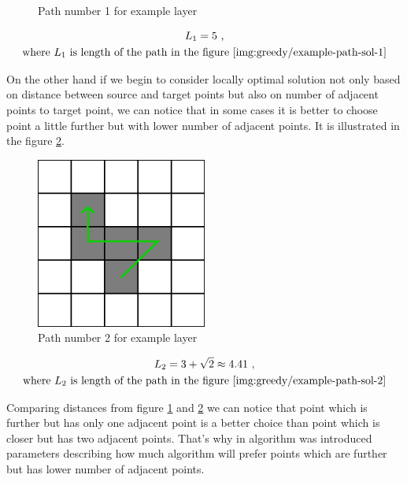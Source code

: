 \documentclass[titlepage]{article}
\newcommand{\multifigcaption}{\captionsetup{justification=justified}}
\begin{document}
\begin{figure}[H]
\begin{center}
\begin{minipage}{.45\linewidth}
			\multifigcaption
			\caption{Path number 1 for example layer}
			\label{img:greedy/example-path-sol-1}
		\end{minipage}
	\end{center}
\end{figure}

\begin{gather*}
	L_1 = 5 \mbox{ ,} \\
	\mbox{where }L_1 \mbox{ is length of the path in the figure \ref{img:greedy/example-path-sol-1}}
\end{gather*}



On the other hand if we begin to consider locally optimal solution not only based on distance between source and target points but also on number of adjacent points to target point, we can notice that in some cases it is better to choose point a little further but with lower number of adjacent points. It is illustrated in the figure \ref{img:greedy/example-path-sol-2}.

\begin{figure}[H]
	\begin{center}
		\includegraphics[width=0.5\textwidth]{img/greedy/example-path-sol-2}
		\caption{Path number 2 for example layer}
		\label{img:greedy/example-path-sol-2}
	\end{center}
\end{figure}

\begin{gather*}
	L_2 = 3 + \sqrt{2} \approx 4.41 \mbox{ ,} \\
	\mbox{where }L_2 \mbox{ is length of the path in the figure \ref{img:greedy/example-path-sol-2}}
\end{gather*}

Comparing distances from figure \ref{img:greedy/example-path-sol-1} and \ref{img:greedy/example-path-sol-2}  we can notice that point which is further but has only one adjacent point is a better choice than point which is closer but has two adjacent points. That's why in algorithm was introduced parameters describing how much algorithm will prefer points which are further but has lower number of adjacent points. 
\end{document}
